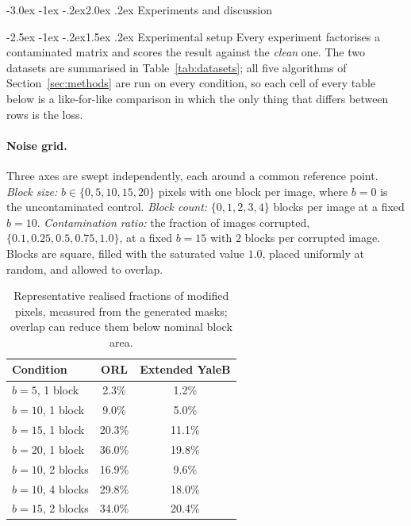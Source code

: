 \documentclass[12pt,a4paper]{article}
\makeatletter
\renewcommand\section{\@startsection{section}{1}{\z@}%
    {-3.0ex \@plus -1ex \@minus -.2ex}{2.0ex \@plus.2ex}%
    {\normalfont\fontsize{13}{15}\bfseries}}
\renewcommand\subsection{\@startsection{subsection}{2}{\z@}%
    {-2.5ex \@plus -1ex \@minus -.2ex}{1.5ex \@plus.2ex}%
    {\normalfont\fontsize{12}{14}\bfseries}}
\makeatother
\begin{document}
\section{Experiments and discussion}
\label{sec:experiments}

\subsection{Experimental setup}
Every experiment factorises a contaminated matrix and scores the result
against the \emph{clean} one. The two datasets are summarised in
Table~\ref{tab:datasets}; all five algorithms of Section~\ref{sec:methods} are
run on every condition, so each cell of every table below is a like-for-like
comparison in which the only thing that differs between rows is the loss.

\paragraph{Noise grid.} Three axes are swept independently, each around a
common reference point. \emph{Block size:} $b \in \{0,5,10,15,20\}$ pixels
with one block per image, where $b=0$ is the uncontaminated control.
\emph{Block count:} $\{0,1,2,3,4\}$ blocks per image at a fixed $b=10$.
\emph{Contamination ratio:} the fraction of images corrupted,
$\{0.1, 0.25, 0.5, 0.75, 1.0\}$, at a fixed $b=15$ with $2$ blocks per
corrupted image. Blocks are square, filled with the saturated value $1.0$,
placed uniformly at random, and allowed to overlap.

\begin{table}[tbp]
  \centering
  \caption{Representative realised fractions of modified pixels, measured
           from the generated masks; overlap can reduce them below nominal
           block area.}
  \label{tab:pixel-fractions}
  \scriptsize
  \setlength{\tabcolsep}{3.5pt}
  \renewcommand{\arraystretch}{0.9}
  \begin{tabular}{lcc}
    \toprule
    Condition & ORL & Extended YaleB \\
    \midrule
    $b=5$, 1 block & 2.3\% & 1.2\% \\
    $b=10$, 1 block & 9.0\% & 5.0\% \\
    $b=15$, 1 block & 20.3\% & 11.1\% \\
    $b=20$, 1 block & 36.0\% & 19.8\% \\
    $b=10$, 2 blocks & 16.9\% & 9.6\% \\
    $b=10$, 4 blocks & 29.8\% & 18.0\% \\
    $b=15$, 2 blocks & 34.0\% & 20.4\% \\
    \bottomrule
  \end{tabular}
\end{table}
\end{document}
